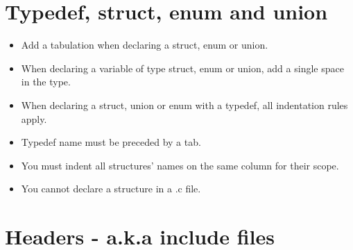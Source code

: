 \documentclass{42-en}
\begin{document}
    \section{Typedef, struct, enum and union}

        \begin{itemize}

            \item Add a tabulation when declaring a struct, enum or union.

            \item When declaring a variable of type struct, enum or union,
                add a single space in the type.

            \item When declaring a struct, union or enum with a typedef,
                all indentation rules apply.

            \item Typedef name must be preceded by a tab.

            \item You must indent all structures' names on the same column for their scope.

            \item You cannot declare a structure in a .c file.

        \end{itemize}
        \newpage


    \section{Headers - a.k.a include files}
\end{document}
